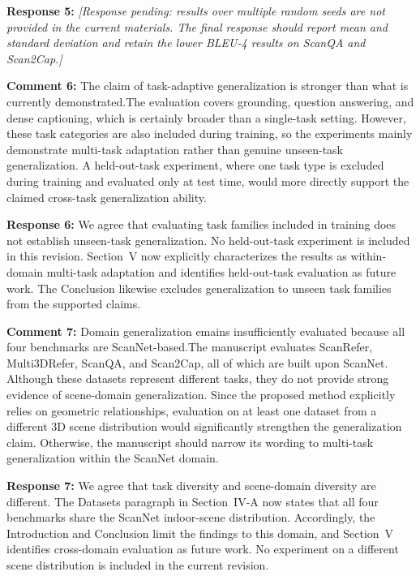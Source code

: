 \noindent\textbf{Response 5:}
\textit{[Response pending: results over multiple random seeds are not provided in the current materials. The final response should report mean and standard deviation and retain the lower BLEU-4 results on ScanQA and Scan2Cap.]}
\vspace{\resafter}


{\noindent\color{comment}
\textbf{Comment 6:}
The claim of task-adaptive generalization is stronger than what is currently demonstrated.The evaluation covers grounding, question answering, and dense captioning, which is certainly broader than a single-task setting. However, these task categories are also included during training, so the experiments mainly demonstrate multi-task adaptation rather than genuine unseen-task generalization.  A held-out-task experiment, where one task type is excluded during training and evaluated only at test time, would more directly support the claimed cross-task generalization ability.
}\vspace{\comafter}

\noindent\textbf{Response 6:}
We agree that evaluating task families included in training does not establish unseen-task generalization. No held-out-task experiment is included in this revision. Section~V now explicitly characterizes the results as within-domain multi-task adaptation and identifies held-out-task evaluation as future work. The Conclusion likewise excludes generalization to unseen task families from the supported claims.
\vspace{\resafter}


{\noindent\color{comment}
\textbf{Comment 7:}
Domain generalization emains insufficiently evaluated because all four benchmarks are ScanNet-based.The manuscript evaluates ScanRefer, Multi3DRefer, ScanQA, and Scan2Cap, all of which are built upon ScanNet.  Although these datasets represent different tasks, they do not provide strong evidence of scene-domain generalization. Since the proposed method explicitly relies on geometric relationships, evaluation on at least one dataset from a different 3D scene distribution would significantly strengthen the generalization claim. Otherwise, the manuscript should narrow its wording to multi-task generalization within the ScanNet domain.
}\vspace{\comafter}

\noindent\textbf{Response 7:}
We agree that task diversity and scene-domain diversity are different. The Datasets paragraph in Section~IV-A now states that all four benchmarks share the ScanNet indoor-scene distribution. Accordingly, the Introduction and Conclusion limit the findings to this domain, and Section~V identifies cross-domain evaluation as future work. No experiment on a different scene distribution is included in the current revision.
\vspace{\resafter}


